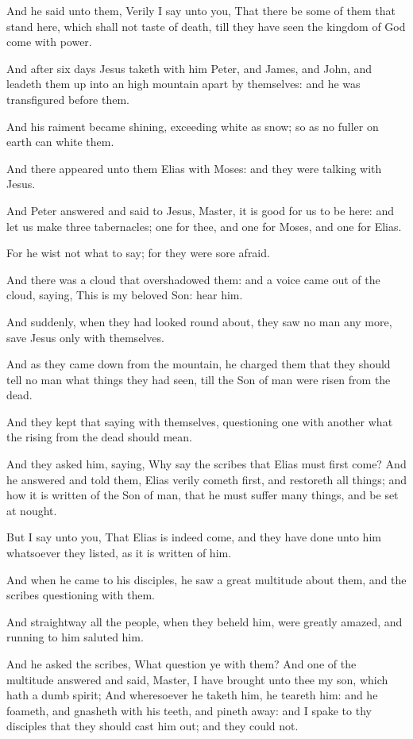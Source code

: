 \Chapter
\Verse And he said unto them, Verily I say unto you, That there be some of them that stand here, which shall not taste of death, till they have seen the kingdom of God come with power.

\Verse And after six days Jesus taketh with him Peter, and James, and John, and leadeth them up into an high mountain apart by themselves: and he was transfigured before them.

\Verse And his raiment became shining, exceeding white as snow; so as no fuller on earth can white them.

\Verse And there appeared unto them Elias with Moses: and they were talking with Jesus.

\Verse And Peter answered and said to Jesus, Master, it is good for us to be here: and let us make three tabernacles; one for thee, and one for Moses, and one for Elias.

\Verse For he wist not what to say; for they were sore afraid.

\Verse And there was a cloud that overshadowed them: and a voice came out of the cloud, saying, This is my beloved Son: hear him.

\Verse And suddenly, when they had looked round about, they saw no man any more, save Jesus only with themselves.

\Verse And as they came down from the mountain, he charged them that they should tell no man what things they had seen, till the Son of man were risen from the dead.

\Verse And they kept that saying with themselves, questioning one with another what the rising from the dead should mean.

\Verse And they asked him, saying, Why say the scribes that Elias must first come?  \Verse And he answered and told them, Elias verily cometh first, and restoreth all things; and how it is written of the Son of man, that he must suffer many things, and be set at nought.

\Verse But I say unto you, That Elias is indeed come, and they have done unto him whatsoever they listed, as it is written of him.

\Verse And when he came to his disciples, he saw a great multitude about them, and the scribes questioning with them.

\Verse And straightway all the people, when they beheld him, were greatly amazed, and running to him saluted him.

\Verse And he asked the scribes, What question ye with them?  \Verse And one of the multitude answered and said, Master, I have brought unto thee my son, which hath a dumb spirit; \Verse And wheresoever he taketh him, he teareth him: and he foameth, and gnasheth with his teeth, and pineth away: and I spake to thy disciples that they should cast him out; and they could not.

